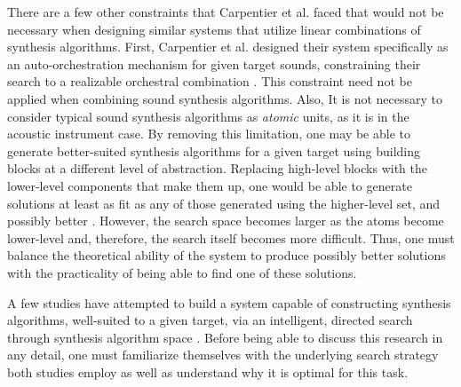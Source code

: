 \documentclass[12pt]{report} 	%
\numberwithin{figure}{chapter}
\numberwithin{table}{chapter}
\numberwithin{equation}{chapter}
\begin{document}
\begin{flushleft}
There are a few other constraints that Carpentier et al. faced that would not be necessary when designing similar systems that utilize linear combinations of synthesis algorithms. First, Carpentier et al. designed their system specifically as an auto-orchestration mechanism for given target sounds, constraining their search to a realizable orchestral combination \cite{Carpentier:2010fh}. This constraint need not be applied when combining sound synthesis algorithms. Also, It is not necessary to consider typical sound synthesis algorithms as \textit{atomic} units, as it is in the acoustic instrument case. By removing this limitation, one may be able to generate better-suited synthesis algorithms for a given target using building blocks at a different level of abstraction. Replacing high-level blocks with the lower-level components that make them up, one would be able to generate solutions at least as fit as any of those generated using the higher-level set, and possibly better \cite[p. 2]{Garcia:2000th}. However, the search space becomes larger as the atoms become lower-level and, therefore, the search itself becomes more difficult. Thus, one must balance the theoretical ability of the system to produce possibly better solutions with the practicality of being able to find one of these solutions. 

A few studies have attempted to build a system capable of constructing synthesis algorithms, well-suited to a given target, via an intelligent, directed search through synthesis algorithm space \cite{Wehn:1998bh, Garcia:2000th, Garcia:2002cq}. Before being able to discuss this research in any detail, one must familiarize themselves with the underlying search strategy both studies employ as well as understand why it is optimal for this task.
\vspace{12pt}

\end{flushleft}
\end{document}
